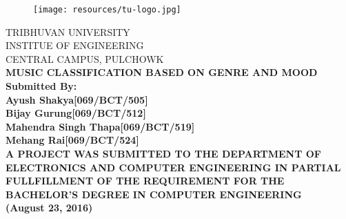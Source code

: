 \newpage
{}
\begin{figure}[t]
        \centering
        \texttt{[image: resources/tu-logo.jpg]}
\end{figure}
\begin{nscenter}
        TRIBHUVAN UNIVERSITY\\ 
        INSTITUE OF ENGINEERING\\
        CENTRAL CAMPUS, PULCHOWK\\
        \vspace{21mm}
        \bfseries{
                MUSIC CLASSIFICATION BASED ON GENRE AND MOOD\\
        }
        \vspace{14mm}
        \textbf {Submitted By:}\\
        \textnormal{
                Ayush Shakya\hspace{25mm}[069/BCT/505]\\
                Bijay Gurung\hspace{25mm}[069/BCT/512]\\
                Mahendra Singh Thapa\hspace{9mm}[069/BCT/519]\\
                Mehang Rai\hspace{28mm}[069/BCT/524]\\
        } 
        \vspace{18mm}
        \textnormal{
                A PROJECT WAS SUBMITTED TO THE DEPARTMENT OF ELECTRONICS
                AND COMPUTER ENGINEERING IN PARTIAL FULLFILLMENT OF THE REQUIREMENT
                FOR THE BACHELOR’S DEGREE IN COMPUTER ENGINEERING\\
                \vspace{17mm}
                (August 23, 2016)
        }
\end{nscenter}
